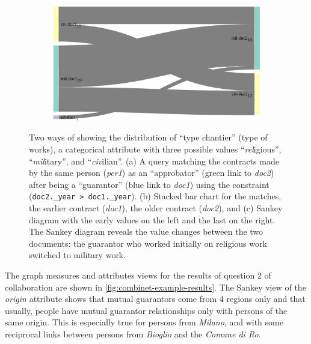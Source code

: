 \begin{figure}[!ht]
\begin{subfigure}[b]{0.3\linewidth}
    \caption{}
    \end{subfigure}
    \begin{subfigure}[b]{0.44\linewidth}
    \includegraphics[width=\textwidth]{static/figures/ComBiNet/OriginalPaperFigures/CGF/sankeyPLot/sankey_bigger.pdf}
    \caption{}
    \end{subfigure}
    \caption{Two ways of showing the distribution of ``type chantier'' (type of works), a categorical attribute with three possible values ``\textsl{rel}igious'', ``\textsl{mil}itary'', and ``\textsl{civ}ilian''.
    (a) A query matching the contracts made by the same person (\textit{per1}) as an ``approbator'' (green link to \textit{doc2}) after being a ``guarantor'' (blue link to \textit{doc1}) using the constraint (\texttt{doc2.\_year > doc1.\_year}). (b) Stacked bar chart for the matches, the earlier contract (\textit{doc1}), the older contract (\textit{doc2}), and (c) Sankey diagram with the early values on the left and the last on the right.
    The Sankey diagram reveals the value changes between the two documents: the guarantor who worked initially on religious work switched to military work.} \label{fig:sankeys}
\end{figure}

The graph measures and attributes views for the results of question 2 of collaboration \pascal are shown in \autoref{fig:combinet-example-results}.
The Sankey view of the \textit{origin} attribute shows that mutual guarantors come from 4 regions only and that usually, people have mutual guarantor relationships only with persons of the same origin.
This is especially true for persons from \textit{Milano}, and with some reciprocal links between persons from \textit{Bioglio} and the \textit{Comune di Ro}.




